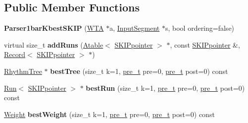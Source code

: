 \subsection*{Public Member Functions}
\begin{DoxyCompactItemize}
\item 
\mbox{\label{classParser1barKbestSKIP_a2fa17574de515125a2415aa011d76662}} 
{\bfseries Parser1bar\+Kbest\+S\+K\+IP} (\mbox{\hyperlink{classWTA}{W\+TA}} $\ast$a, \mbox{\hyperlink{classInputSegment}{Input\+Segment}} $\ast$s, bool ordering=false)
\item 
\mbox{\label{classParser1barKbestSKIP_a4ca554d85c44554636f8f0c80a65accd}} 
virtual size\+\_\+t {\bfseries add\+Runs} (\mbox{\hyperlink{classAtable}{Atable}}$<$ \mbox{\hyperlink{classSKIPpointer}{S\+K\+I\+Ppointer}} $>$ $\ast$, const \mbox{\hyperlink{classSKIPpointer}{S\+K\+I\+Ppointer}} \&, \mbox{\hyperlink{classRecord}{Record}}$<$ \mbox{\hyperlink{classSKIPpointer}{S\+K\+I\+Ppointer}} $>$ $\ast$)
\item 
\mbox{\label{classParser1barKbestSKIP_af59a31915da55685e102916577c37dd8}} 
\mbox{\hyperlink{classRhythmTree}{Rhythm\+Tree}} $\ast$ {\bfseries best\+Tree} (size\+\_\+t k=1, \mbox{\hyperlink{group__general_ga092fe8b972dfa977c2a0886720a7731e}{pre\+\_\+t}} pre=0, \mbox{\hyperlink{group__general_ga092fe8b972dfa977c2a0886720a7731e}{pre\+\_\+t}} post=0) const
\item 
\mbox{\label{classParser1barKbestSKIP_a618fea1afb155bcc34a337a30744dc46}} 
\mbox{\hyperlink{classRun}{Run}}$<$ \mbox{\hyperlink{classSKIPpointer}{S\+K\+I\+Ppointer}} $>$ $\ast$ {\bfseries best\+Run} (size\+\_\+t k=1, \mbox{\hyperlink{group__general_ga092fe8b972dfa977c2a0886720a7731e}{pre\+\_\+t}} pre=0, \mbox{\hyperlink{group__general_ga092fe8b972dfa977c2a0886720a7731e}{pre\+\_\+t}} post=0) const
\item 
\mbox{\label{classParser1barKbestSKIP_af7baa4a64189153a64c6283ae566de1f}} 
\mbox{\hyperlink{classWeight}{Weight}} {\bfseries best\+Weight} (size\+\_\+t k=1, \mbox{\hyperlink{group__general_ga092fe8b972dfa977c2a0886720a7731e}{pre\+\_\+t}} pre=0, \mbox{\hyperlink{group__general_ga092fe8b972dfa977c2a0886720a7731e}{pre\+\_\+t}} post=0) const
\item 

\end{DoxyCompactItemize}
